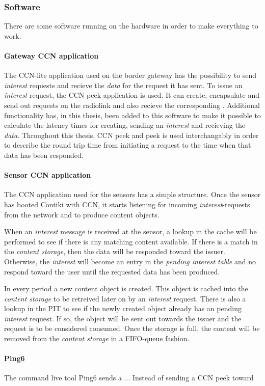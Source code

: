 \subsubsection{Software}
There are some software running on the hardware in order to make everything to work. 

\paragraph{Gateway CCN application}
The CCN-lite application used on the border gateway has the possibility to send \textit{interest} requests and recieve the \textit{data} for the request it has sent. To issue an \textit{interest} request, the CCN peek application is used. It can create, encapsulate and send out requests on the radiolink and also recieve the corresponding . Additional functionality has, in this thesis, been added to this software to make it possible to calculate the latency times for creating, sending an \textit{interest} and recieving the \textit{data}. Throughout this thesis, CCN peek and peek is used interchangably in order to describe the round trip time from initiating a request to the time when that data has been responded. 

\paragraph{Sensor CCN application}
The CCN application used for the sensors has a simple structure. Once the sensor has booted Contiki with CCN, it starts listening for incoming \textit{interest}-requests from the network and to produce content objects.

When an \textit{interest} message is received at the sensor, a lookup in the cache will be performed to see if there is any matching content available. If there is a match in the \textit{content storage}, then the data will be responded toward the issuer. Otherwise, the \textit{interest} will become an entry in the \textit{pending interest table} and no respond toward the user until the requested data has been produced.

In every period a new content object is created. This object is cached into the \textit{content storage} to be retreived later on by an \textit{interest} request. There is also a lookup in the PIT to see if the newly created object already has an pending \textit{interest} request. If so, the object will be sent out towards the issuer and the request is to be considered consumed. Once the storage is full, the content will be removed from the \textit{content storage} in a FIFO-queue fashion.


\paragraph{Ping6}
The command live tool Ping6 sends a ... Instead of sending a CCN peek toward